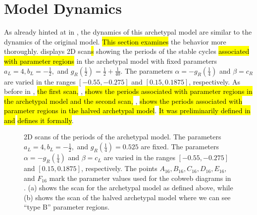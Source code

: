\section{Model Dynamics}
\label{sec:arch.dynamics}

As already hinted at in , the dynamics of this archetypal model are similar to the dynamics of the original model.
\hl{This section examines} the behavior more thoroughly.
 displays 2D scan\hl{s} showing the periods of the stable cycles \hl{associated with parameter regions} in the archetypal model with fixed parameters $a_L = 4, b_L = -\frac{1}{2},$ and $g_R\left(\frac{1}{2}\right) = \frac{1}{2} + \frac{1}{40}$.
The parameters $\alpha = -g_R\left(\frac{1}{4}\right)$ and $\beta = c_R$ are varied in the ranges $[-0.55, -0.275]$ and $[0.15, 0.1875]$, respectively.
As before in , \hl{the first scan,} , \hl{shows the periods associated with parameter regions in the archetypal model and the second scan,} , \hl{shows the periods associated with parameter regions in the halved archetypal model}.
\hl{It was preliminarily defined in}  \hl{and}  \hl{defines it formally}.

\begin{figure}
	\centering
	\caption[2D scans of the periods of the archetypal model]{
		2D scans of the periods of the archetypal model.
		The parameters $a_L = 4, b_L = -\frac{1}{2},$ and $g_R\left(\frac{1}{4}\right) = 0.525$ are fixed.
		The parameters $\alpha = -g_R\left(\frac{1}{4}\right)$ and $\beta = c_L$ are varied in the ranges $[-0.55, -0.275]$ and $[0.15, 0.1875]$, respectively.
		The points $A_{16}, B_{16}, C_{16}, D_{16}, E_{16},$ and $F_{16}$ mark the parameter values used for the cobweb diagrams in .
		(a) shows the scan for the archetypal model as defined above, while (b) shows the scan of the halved archetypal model where we can see ``type B'' parameter regions.
	}
	\label{fig:arch.dyn.period}
\end{figure}


